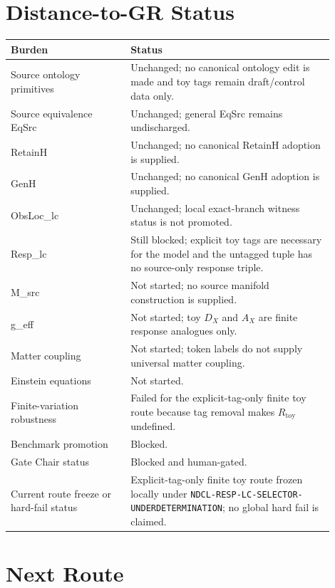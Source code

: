 \documentclass[11pt]{article}
\begin{document}
\section{Distance-to-GR Status}

\begin{center}
\begin{tabular}{p{0.33\linewidth}p{0.57\linewidth}}
\hline
Burden & Status \\
\hline
Source ontology primitives & Unchanged; no canonical ontology edit is made and toy tags remain draft/control data only. \\
Source equivalence EqSrc & Unchanged; general EqSrc remains undischarged. \\
RetainH & Unchanged; no canonical RetainH adoption is supplied. \\
GenH & Unchanged; no canonical GenH adoption is supplied. \\
ObsLoc\_lc & Unchanged; local exact-branch witness status is not promoted. \\
Resp\_lc & Still blocked; explicit toy tags are necessary for the model and the untagged tuple has no source-only response triple. \\
M\_src & Not started; no source manifold construction is supplied. \\
g\_eff & Not started; toy \(D_X\) and \(A_X\) are finite response analogues only. \\
Matter coupling & Not started; token labels do not supply universal matter coupling. \\
Einstein equations & Not started. \\
Finite-variation robustness & Failed for the explicit-tag-only finite toy route because tag removal makes \(R_{\mathrm{toy}}\) undefined. \\
Benchmark promotion & Blocked. \\
Gate Chair status & Blocked and human-gated. \\
Current route freeze or hard-fail status & Explicit-tag-only finite toy route frozen locally under \texttt{NDCL-RESP-LC-SELECTOR-UNDERDETERMINATION}; no global hard fail is claimed. \\
\hline
\end{tabular}
\end{center}

\section{Next Route}
\end{document}
